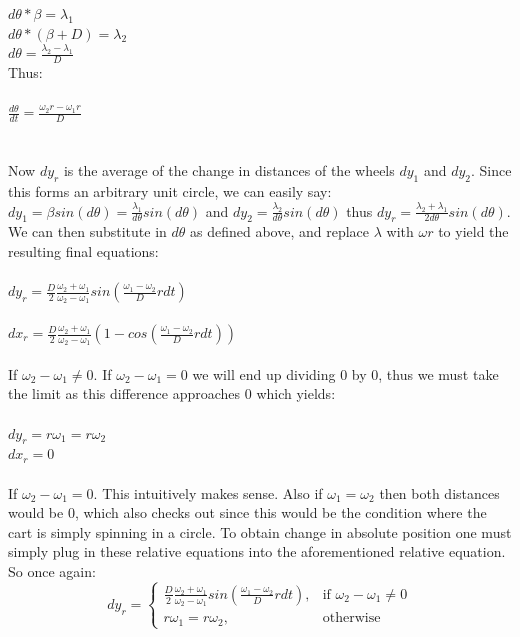 \documentclass[a4paper,12pt]{article}
\begin{document}
$d\theta*\beta = \lambda_{1}$\\
$d\theta*(\beta + D) = \lambda_{2}$\\
$d\theta= \frac{\lambda_{2} - \lambda_{1}}{D}$\\
Thus:\\\\
\boldmath$\frac{d\theta}{dt}= \frac{\omega_{2}r - \omega_{1}r}{D}$\unboldmath\\\\\\
Now $dy_r$ is the average of the change in distances of the wheels $dy_{1}$ and $dy_{2}$. Since this forms an arbitrary unit circle, we can easily say:$dy_{1} = \beta sin(d\theta) = \frac{\lambda_{1}}{d\theta} sin(d\theta)$ and $dy_{2} = \frac{\lambda_{2}}{d\theta} sin(d\theta)$ thus $dy_r = \frac{\lambda_{2}+\lambda_{1}}{2d\theta} sin(d\theta)$. We can then substitute in $d\theta$ as defined above, and replace $\lambda$ with $\omega r$ to yield the resulting final equations:\\\\

$dy_r = \frac{D}{2}\frac{\omega_{2}+\omega_{1}}{\omega_{2}-\omega_{1}} sin(\frac{\omega_1 - \omega_2}{D}rdt)$\\\\

$dx_r = \frac{D}{2}\frac{\omega_{2}+\omega_{1}}{\omega_{2}-\omega_{1}} (1 - cos(\frac{\omega_1 - \omega_2}{D}rdt))$\\\\
If $\omega_{2}-\omega_{1} \neq 0$. If $\omega_{2}-\omega_{1} = 0$ we will end up dividing 0 by 0, thus we must take the limit as this difference approaches 0 which yields:\\\\
$dy_r = r\omega_1 = r\omega_2$\\
$dx_r =0$\\\\
If $\omega_{2}-\omega_{1} = 0$. This intuitively makes sense. Also if $\omega_1 = \omega_2$ then both distances would be 0, which also checks out since this would be the condition where the cart is simply spinning in a circle. To obtain change in absolute position one must simply plug in these relative equations into the aforementioned relative equation. So once again:\\
\[
    dy_r= 
\begin{cases}
    \frac{D}{2}\frac{\omega_{2}+\omega_{1}}{\omega_{2}-\omega_{1}} sin(\frac{\omega_1 - \omega_2}{D}rdt),& \text{if } \omega_{2}-\omega_{1} \neq 0\\
    r\omega_1 = r\omega_2,              & \text{otherwise}
\end{cases}
\]
\end{document}
